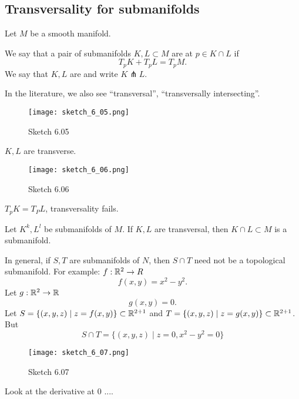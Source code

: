 \subsection{Transversality for submanifolds}

Let \(M\) be a smooth manifold. 
\begin{definition*}
    We say that a pair of submanifolds \(K,L\subset M\) are  at \(p\in K\cap L\) if 
    \[T_p K + T_p L = T_p M.\]
    We say that \(K,L\) are  and write \(K\pitchfork L\).
\end{definition*}

\begin{remark}
    In the literature, we  also see ``transversal'', ``transversally intersecting''. 
\end{remark}

\begin{example}
    \begin{figure}[H]
        \centering
        \texttt{[image: sketch\_6\_05.png]}
        \caption{Sketch 6.05}
    \end{figure}
    \(K,L\) are transverse.
    \begin{figure}[H]
        \centering
        \texttt{[image: sketch\_6\_06.png]}
        \caption{Sketch 6.06}
    \end{figure}
    \(T_p K=T_P L\), transversality fails.
\end{example}

\begin{lemma}\label{lem:6.1}
    Let \(K^k,L^l\) be submanifolds of \(M\). If \(K,L\) are transversal, then 
    \(K\cap L \subset M\) is a submanifold.
\end{lemma}

\begin{remark}
    In general, if \(S,T\) are submanifolds of \(N\), then \(S\cap T\) need not be a topological submanifold.
    For example: \(f:\mathbb{R}^2\to R\)
    \[f(x,y)=x^2-y^2.\]
    Let \(g:\mathbb{R}^2\to \mathbb{R}\) 
    \[g(x,y)=0.\]
    Let \(S=\{(x,y,z)\mid z=f(x,y)\}\subset \mathbb{R}^{2+1}\) and \(T=\{(x,y,z)\mid z=g(x,y)\}\subset \mathbb{R}^{2+1}\).
    But \[S\cap T=\{(x,y,z)\mid z=0,x^2-y^2=0\}\]
    \begin{figure}[H]
        \centering
        \texttt{[image: sketch\_6\_07.png]}
        \caption{Sketch 6.07}
    \end{figure} 
    Look at the derivative at 0 .... %
\end{remark}

